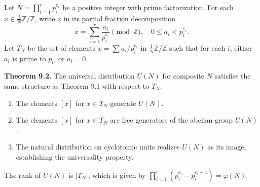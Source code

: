 Let $N = \prod_{i=1}^{r} p_i^{e_i}$ be a positive integer with prime factorization. For each $x \in \frac{1}{N}\mathbb{Z}/\mathbb{Z}$, write $x$ in its partial fraction decomposition
$$x = \sum_{i=1}^{r} \frac{a_i}{p_i^{e_i}} \pmod{\mathbb{Z}}, \quad 0 \leq a_i < p_i^{e_i}.$$
Let $T_N$ be the set of elements $x = \sum a_i/p_i^{e_i}$ in $\frac{1}{N}\mathbb{Z}/\mathbb{Z}$ such that for each $i$, either $a_i$ is prime to $p_i$, or $a_i = 0$.

\textbf{Theorem 9.2.} The universal distribution $U(N)$ for composite $N$ satisfies the same structure as Theorem 9.1 with respect to $T_N$:
\begin{enumerate}
  \item[(i)] The elements $[x]$ for $x \in T_N$ generate $U(N)$.
  \item[(ii)] The elements $[x]$ for $x \in T_N$ are free generators of the abelian group $U(N)$.
  \item[(iii)] The natural distribution on cyclotomic units realizes $U(N)$ as its image, establishing the universality property.
\end{enumerate}
The rank of $U(N)$ is $|T_N|$, which is given by $\prod_{i=1}^{r} (p_i^{e_i} - p_i^{e_i-1}) = \varphi(N)$.

